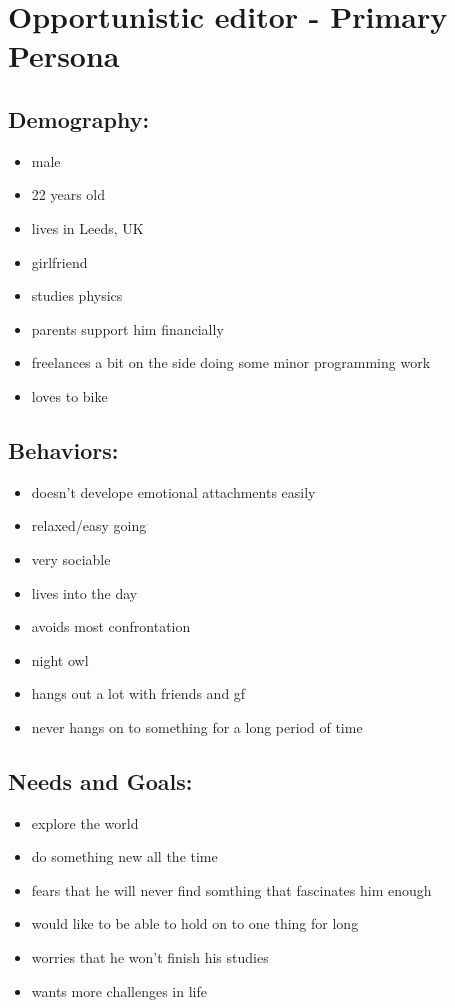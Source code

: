 \documentclass{article}
\date{11.11.2015}
\begin{document}
\section{Opportunistic editor - Primary Persona}

\subsection{Demography:}
\begin{itemize}
 \item male
 \item 22 years old
 \item lives in Leeds, UK
 \item girlfriend
 \item studies physics 
 \item parents support him financially
 \item freelances a bit on the side doing some minor programming work
 \item loves to bike
\end{itemize}

\subsection{Behaviors:}
\begin{itemize}
\item doesn't develope emotional attachments easily
\item relaxed/easy going
\item very sociable
\item lives into the day
\item avoids most confrontation
\item night owl
\item hangs out a lot with friends and gf
\item never hangs on to something for a long period of time
\end{itemize}

\subsection{Needs and Goals:}
\begin{itemize}
 \item explore the world
 \item do something new all the time
 \item fears that he will never find somthing that fascinates him enough
 \item would like to be able to hold on to one thing for long
 \item worries that he won't finish his studies
 \item wants more challenges in life
\end{itemize}
\end{document}

